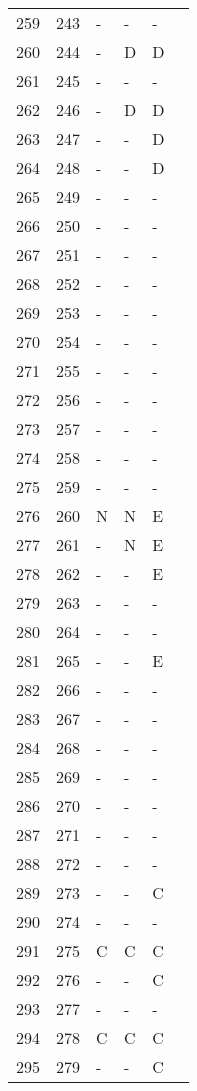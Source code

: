 \documentclass[10pt]{article}
\begin{document}
\begin{longtable}{llllll}
  259 & 243 & - & - & - &  \\ 
  260 & 244 & - & D & D &  \\ 
  261 & 245 & - & - & - &  \\ 
  262 & 246 & - & D & D &  \\ 
  263 & 247 & - & - & D &  \\ 
  264 & 248 & - & - & D &  \\ 
  265 & 249 & - & - & - &  \\ 
  266 & 250 & - & - & - &  \\ 
  267 & 251 & - & - & - &  \\ 
  268 & 252 & - & - & - &  \\ 
  269 & 253 & - & - & - &  \\ 
  270 & 254 & - & - & - &  \\ 
  271 & 255 & - & - & - &  \\ 
  272 & 256 & - & - & - &  \\ 
  273 & 257 & - & - & - &  \\ 
  274 & 258 & - & - & - &  \\ 
  275 & 259 & - & - & - &  \\ 
  276 & 260 & N & N & E &  \\ 
  277 & 261 & - & N & E &  \\ 
  278 & 262 & - & - & E &  \\ 
  279 & 263 & - & - & - &  \\ 
  280 & 264 & - & - & - &  \\ 
  281 & 265 & - & - & E &  \\ 
  282 & 266 & - & - & - &  \\ 
  283 & 267 & - & - & - &  \\ 
  284 & 268 & - & - & - &  \\ 
  285 & 269 & - & - & - &  \\ 
  286 & 270 & - & - & - &  \\ 
  287 & 271 & - & - & - &  \\ 
  288 & 272 & - & - & - &  \\ 
  289 & 273 & - & - & C &  \\ 
  290 & 274 & - & - & - &  \\ 
  291 & 275 & C & C & C &  \\ 
  292 & 276 & - & - & C &  \\ 
  293 & 277 & - & - & - &  \\ 
  294 & 278 & C & C & C &  \\ 
  295 & 279 & - & - & C &  \\ 

\end{longtable}
\end{document}
